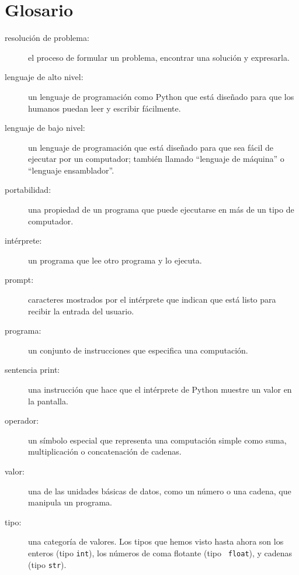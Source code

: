 \documentclass[10pt]{book}
\begin{document}
\section{Glosario}

\begin{description}

\item[resolución de problema:]  el proceso de formular un problema, encontrar
una solución y expresarla.

\item[lenguaje de alto nivel:]  un lenguaje de programación como Python que
está diseñado para que los humanos puedan leer y escribir fácilmente.

\item[lenguaje de bajo nivel:]  un lenguaje de programación que está diseñado
para que sea fácil de ejecutar por un computador; también llamado ``lenguaje de máquina'' o
``lenguaje ensamblador''.

\item[portabilidad:]  una propiedad de un programa que puede ejecutarse en más
de un tipo de computador.

\item[intérprete:]  un programa que lee otro programa y lo
ejecuta.

\item[prompt:] caracteres mostrados por el intérprete que indican
que está listo para recibir la entrada del usuario.

\item[programa:] un conjunto de instrucciones que especifica una computación.

\item[sentencia print:]  una instrucción que hace que el intérprete de Python
muestre un valor en la pantalla.

\item[operador:]  un símbolo especial que representa una computación simple
como suma, multiplicación o concatenación de cadenas.

\item[valor:]  una de las unidades básicas de datos, como un número o una cadena,
que manipula un programa.

\item[tipo:] una categoría de valores.  Los tipos que hemos visto hasta ahora
son los enteros (tipo {\tt int}), los números de coma flotante (tipo {\tt
float}), y cadenas (tipo {\tt str}).


\end{description}
\end{document}
